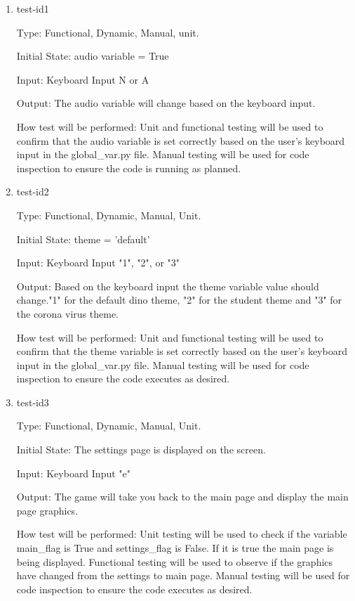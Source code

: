 \documentclass[12pt, titlepage]{article}
\begin{document}
	\begin{enumerate}
		
		\item{test-id1\\}
		
		Type: Functional, Dynamic, Manual, unit.
		
		Initial State: audio variable = True
		
		Input: Keyboard Input N or A 
		
		Output: The audio variable will change based on the keyboard input. 
		
		How test will be performed: Unit and functional testing will be used to confirm that the audio variable is set correctly based on the user's keyboard input in the global\_var.py file. Manual testing will be used for code inspection to ensure the code is running as planned. 
		
		\item{test-id2\\}
		
		Type: Functional, Dynamic, Manual, Unit.
		
		Initial State: theme = 'default'
		
		Input: Keyboard Input "1", "2", or "3"
		
		Output: Based on the keyboard input the theme variable value should change."1" for the default dino theme, "2" for the student theme and "3" for the corona virus theme.
		
		How test will be performed: Unit and functional testing will be used to confirm that the theme variable is set correctly based on the user's keyboard input in the global\_var.py file. Manual testing will be used for code inspection to ensure the code executes as desired. 
		
		\item{test-id3\\}
		
		Type: Functional, Dynamic, Manual, Unit.
		
		Initial State: The settings page is displayed on the screen. 
		
		Input: Keyboard Input "e"
		
		Output: The game will take you back to the main page and display the main page graphics. 
		
		How test will be performed: Unit testing will be used to check if the variable main\_flag is True and settings\_flag is False. If it is true the main page is being displayed. Functional testing will be used to observe if the graphics have changed from the settings to main page. Manual testing will be used for code inspection to ensure the code executes as desired. 
		
	\end{enumerate}
	
\end{document}
